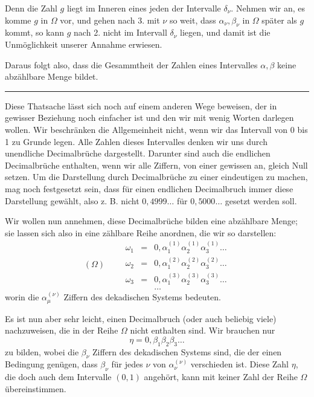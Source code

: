 \documentclass[11pt]{article}
\begin{document}
Denn die Zahl $g$ liegt im Inneren eines jeden der Intervalle $\delta_\nu$. Nehmen wir an, es komme $g$ in $\Omega$ vor, und gehen nach 3. mit $\nu$ so weit, dass $\alpha_\nu,\beta_\nu$ in $\Omega$ später als $g$ kommt, so kann $g$ nach 2. nicht im Intervall $\delta_\nu$ liegen, und damit ist die Unmöglichkeit unserer Annahme erwiesen.

Daraus folgt also, dass die Gesammtheit der Zahlen eines Intervalles $\alpha,\beta$ keine abzählbare Menge bildet.

\medskip\hrule\medskip

Diese Thatsache lässt sich noch auf einem anderen Wege beweisen, der in gewisser Beziehung noch einfacher ist und den wir mit wenig Worten darlegen wollen. Wir beschränken die Allgemeinheit nicht, wenn wir das Intervall von 0 bis 1 zu Grunde legen. Alle Zahlen dieses Intervalles denken wir uns durch unendliche Decimalbrüche dargestellt. Darunter sind auch die endlichen Decimalbrüche enthalten, wenn wir alle Ziffern, von einer gewissen an, gleich Null setzen. Um die Darstellung durch Decimalbrüche zu einer eindeutigen zu machen, mag noch festgesetzt sein, dass für einen endlichen Decimalbruch immer diese Darstellung gewählt, also z. B. nicht $0{,}4999\ldots$ für $0{,}5000\ldots$ gesetzt werden soll.

Wir wollen nun annehmen, diese Decimalbrüche bilden eine abzählbare Menge; sie lassen sich also in eine zählbare Reihe anordnen, die wir so darstellen:
\[
(\Omega)\qquad
\begin{array}{rcl}
\omega_1&=&0,\alpha_1^{(1)}\alpha_2^{(1)}\alpha_3^{(1)}\ldots\\
\omega_2&=&0,\alpha_1^{(2)}\alpha_2^{(2)}\alpha_3^{(2)}\ldots\\
\omega_3&=&0,\alpha_1^{(3)}\alpha_2^{(3)}\alpha_3^{(3)}\ldots\\
&&\ldots
\end{array}
\]
worin die $\alpha_\mu^{(\nu)}$ Ziffern des dekadischen Systems bedeuten.

Es ist nun aber sehr leicht, einen Decimalbruch (oder auch beliebig viele) nachzuweisen, die in der Reihe $\Omega$ nicht enthalten sind. Wir brauchen nur
\[
\eta=0,\beta_1\beta_2\beta_3\ldots
\]
zu bilden, wobei die $\beta_\nu$ Ziffern des dekadischen Systems sind, die der einen Bedingung genügen, dass $\beta_\nu$ für jedes $\nu$ von $\alpha_\nu^{(\nu)}$
verschieden ist. Diese Zahl $\eta$, die doch auch dem Intervalle $(0,1)$ angehört, kann mit keiner Zahl der Reihe $\Omega$ übereinstimmen.
\end{document}
